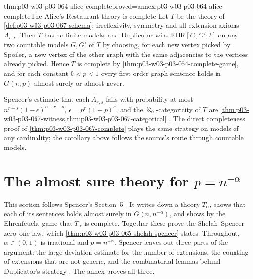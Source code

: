 \begin{hbcorollary}{thm:p03-w03-p03-064-alice-complete}{proved=annex:p03-w03-p03-064-alice-complete}{The Alice's Restaurant theory is complete}
Let \(T\) be the theory of \cref{def:p03-w03-p03-067-schema}: irreflexivity,
symmetry and all extension axioms \(A_{r,s}\).  Then \(T\) has no finite
models, and Duplicator wins \(\mathrm{EHR}[G,G';t]\) on any two countable
models \(G,G'\) of \(T\) by choosing, for each new vertex picked by Spoiler, a
new vertex of the other graph with the same adjacencies to the vertices
already picked.  Hence \(T\) is complete by
\cref{thm:p03-w03-p03-064-complete-game}, and for each constant
\(0<p<1\) every first-order graph sentence holds in \(G(n,p)\) almost surely
or almost never.
\end{hbcorollary}

Spencer's estimate that each \(A_{r,s}\) fails with probability at most
\(n^{r+s}(1-\epsilon)^{n-r-s}\), \(\epsilon=p^r(1-p)^s\), and the
\(\aleph_0\)-categoricity of \(T\) are
\cref{thm:p03-w03-p03-067-witness,thm:p03-w03-p03-067-categorical}
\cite[pp.~12--14]{Spencer2007LogicRandomStructuresAuthor}.  The direct
completeness proof of \cref{thm:p03-w03-p03-067-complete} plays the same
strategy on models of any cardinality; the corollary above follows the
source's route through countable models.

\section{The almost sure theory for \(p=n^{-\alpha}\)}
\label{sec:p03-w03-p03-064-theory}

This section follows Spencer's Section~5
\cite[pp.~9--12]{Spencer2007LogicRandomStructuresAuthor}.  It writes down a
theory \(T_\alpha\), shows that each of its sentences holds almost surely in
\(G(n,n^{-\alpha})\), and shows by the Ehrenfeucht game that \(T_\alpha\) is
complete.  Together these prove the Shelah--Spencer zero--one law, which
\cref{thm:p03-w03-p03-065-shelah-spencer} states.  Throughout,
\(\alpha\in(0,1)\) is irrational and \(p=n^{-\alpha}\).  Spencer leaves out
three parts of the argument: the large deviation estimate for the number of
extensions, the counting of extensions that are not generic, and the
combinatorial lemmas behind Duplicator's strategy
\cite[pp.~10--12]{Spencer2007LogicRandomStructuresAuthor}.  The annex proves
all three.

